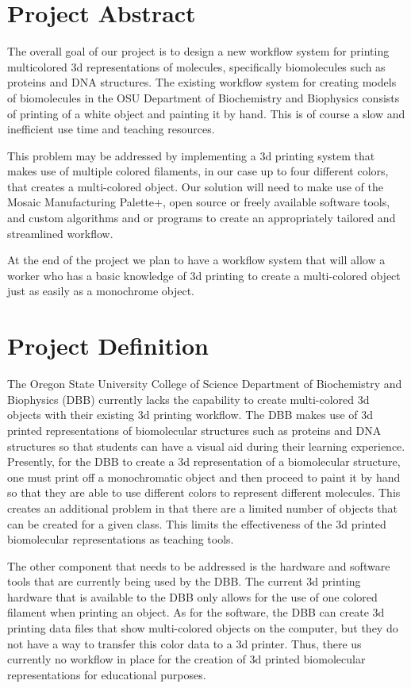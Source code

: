 \documentclass[letterpaper, onecolumn, draftclsnofoot, 10pt, compsoc]{IEEEtran}
\begin{document}
\section{Project Abstract}
    \begin{singlespace}
        The overall goal of our project is to design a new workflow system for printing multicolored 3d representations of molecules, specifically biomolecules such as proteins and DNA structures. The existing workflow system for creating models of biomolecules in the OSU Department of Biochemistry and Biophysics consists of printing of a white object and painting it by hand. This is of course a slow and inefficient use time and teaching resources.\par 
        This problem may be addressed by implementing a 3d printing system that makes use of multiple colored filaments, in our case up to four different colors, that creates a multi-colored object. Our solution will need to make use of the Mosaic Manufacturing Palette+, open source or freely available software tools, and custom algorithms and or programs to create an appropriately tailored and streamlined workflow.\par
        At the end of the project we plan to have a workflow system that will allow a worker who has a basic knowledge of 3d printing to create a multi-colored object just as easily as a monochrome object.
    \end{singlespace}

\section{Project Definition}
    \begin{singlespace}
        The Oregon State University College of Science Department of Biochemistry and Biophysics (DBB) currently lacks the capability to create multi-colored 3d objects with their existing 3d printing workflow. The DBB makes use of 3d printed representations of biomolecular structures such as proteins and DNA structures so that students can have a visual aid during their learning experience. Presently, for the DBB to create a 3d representation of a biomolecular structure, one must print off a monochromatic object and then proceed to paint it by hand so that they are able to use different colors to represent different molecules. This creates an additional problem in that there are a limited number of objects that can be created for a given class. This limits the effectiveness of the 3d printed biomolecular representations as teaching tools.\par
        The other component that needs to be addressed is the hardware and software tools that are currently being used by the DBB. The current 3d printing hardware that is available to the DBB only allows for the use of one colored filament when printing an object. As for the software, the DBB can create 3d printing data files that show multi-colored objects on the computer, but they do not have a way to transfer this color data to a 3d printer. Thus, there us currently no workflow in place for the creation of 3d printed biomolecular representations for educational purposes.
    \end{singlespace}
\end{document}
